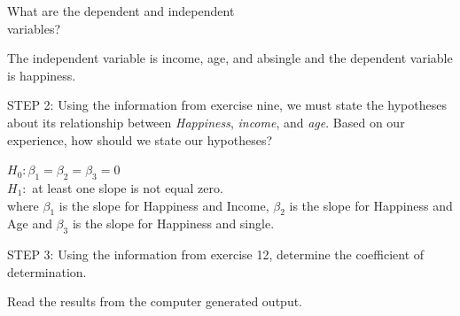 \documentclass[11pt, chapterprefix=true]{scrbook}\usepackage[]{graphicx}\usepackage[]{color}
\begin{document}
\begin{exercises}
\begin{exercise}
What are the dependent and independent \\ variables?

    \vspace{5mm}

    \end{exercise}
    \vspace{2mm}
    \begin{solution}
       The independent variable is income,   age, and absingle and the dependent variable is happiness.
    \end{solution}

  \begin{exercise} %

    STEP 2: Using the information from exercise nine, we must state the hypotheses about its relationship between {\textit{Happiness}}, {\textit{income}}, and {\textit{age}}.  Based on our experience, how should we state our hypotheses?

    \vspace{5mm}

    \end{exercise}
    \vspace{2mm}
    \begin{solution}

       $H_0: \beta_1 = \beta_2 = \beta_3 = 0$ \\
       $H_1:$ at least one slope is not equal zero. \\
       where $\beta_1$ is the slope for Happiness and Income,  $\beta_2$ is the slope for Happiness and Age and $\beta_3$ is         the slope for Happiness and single.

    \end{solution}

  \begin{exercise} %


    STEP 3: Using the information from exercise 12, determine the coefficient of determination.

    \vspace{5mm}

    \end{exercise}
    \vspace{2mm}
    \begin{solution}

       Read the results from the computer generated output.

    \end{solution}


\end{exercises}
\end{document}
